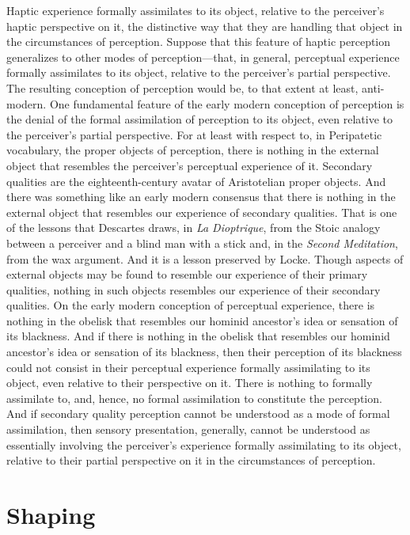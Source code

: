 Haptic experience formally assimilates to its object, relative to the perceiver's haptic perspective on it, the distinctive way that they are handling that object in the circumstances of perception. Suppose that this feature of haptic perception generalizes to other modes of perception---that, in general, perceptual experience formally assimilates to its object, relative to the perceiver's partial perspective. The resulting conception of perception would be, to that extent at least, anti-modern. One fundamental feature of the early modern conception of perception is the denial of the formal assimilation of perception to its object, even relative to the perceiver's partial perspective. For at least with respect to, in Peripatetic vocabulary, the proper objects of perception, there is nothing in the external object that resembles the perceiver's perceptual experience of it. Secondary qualities are the eighteenth-century avatar of Aristotelian proper objects. And there was something like an early modern consensus that there is nothing in the external object that resembles our experience of secondary qualities. That is one of the lessons that Descartes draws, in \emph{La Dioptrique}, from the Stoic analogy between a perceiver and a blind man with a stick and, in the \emph{Second Meditation}, from the wax argument. And it is a lesson preserved by Locke. Though aspects of external objects may be found to resemble our experience of their primary qualities, nothing in such objects resembles our experience of their secondary qualities. On the early modern conception of perceptual experience, there is nothing in the obelisk that resembles our hominid ancestor's idea or sensation of its blackness. And if there is nothing in the obelisk that resembles our hominid ancestor's idea or sensation of its blackness, then their perception of its blackness could not consist in their perceptual experience formally assimilating to its object, even relative to their perspective on it. There is nothing to formally assimilate to, and, hence, no formal assimilation to constitute the perception. And if secondary quality perception cannot be understood as a mode of formal assimilation, then sensory presentation, generally, cannot be understood as essentially involving the perceiver's experience formally assimilating to its object, relative to their partial perspective on it in the circumstances of perception. 


\section{Shaping} %
\label{sec:shaping}

